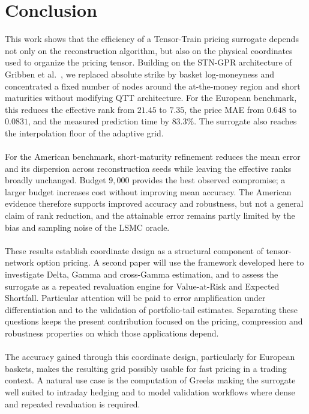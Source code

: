 \documentclass{article}
\numberwithin{equation}{subsection}
\theoremstyle{definition}
\theoremstyle{remark}
\begin{document}
\section{Conclusion}
This work shows that the efficiency of a Tensor-Train pricing surrogate depends
not only on the reconstruction algorithm, but also on the physical coordinates
used to organize the pricing tensor. Building on the STN-GPR architecture of
Gribben et al.\ \cite{Gribben2026STNGPR}, we replaced absolute strike by basket
log-moneyness and concentrated a fixed number of nodes around the at-the-money
region and short maturities without modifying QTT architecture. For the
European benchmark, this reduces the effective rank from \(21.45\) to \(7.35\),
the price MAE from \(0.648\) to \(0.0831\), and the measured prediction time by
\(83.3\%\). The surrogate also reaches the interpolation floor of the adaptive
grid.\\
\\
For the American benchmark, short-maturity refinement reduces the mean error
and its dispersion across reconstruction seeds while leaving the effective
ranks broadly unchanged. Budget \(9{,}000\) provides the best observed
compromise; a larger budget increases cost without improving mean accuracy.
The American evidence therefore supports improved accuracy and robustness, but
not a general claim of rank reduction, and the attainable error remains partly
limited by the bias and sampling noise of the LSMC oracle.\\
\\
These results establish coordinate design as a structural component of
tensor-network option pricing. A second paper will use the framework developed
here to investigate Delta, Gamma and cross-Gamma estimation, and to assess the
surrogate as a repeated revaluation engine for Value-at-Risk and Expected
Shortfall. Particular attention will be paid to error amplification under
differentiation and to the validation of portfolio-tail estimates. Separating
these questions keeps the present contribution focused on the pricing,
compression and robustness properties on which those applications depend.\\
\\
The accuracy gained through this coordinate design, particularly for European baskets, makes the resulting grid possibly usable for fast pricing in a trading context. A natural use case is the computation of Greeks making the surrogate well suited to intraday hedging and to model validation workflows where dense and repeated revaluation is required.\\
\end{document}
